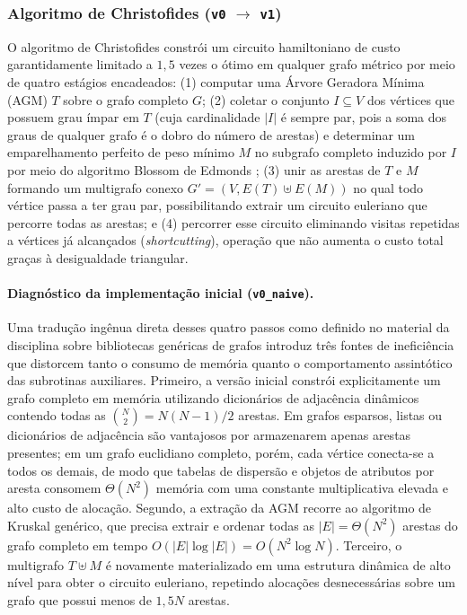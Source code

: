 \subsubsection{Algoritmo de Christofides (\texttt{v0} \texorpdfstring{$\rightarrow$}{->} \texttt{v1})}
\label{sec:christofides}

O algoritmo de Christofides \cite{christofides1976worst} constrói um circuito hamiltoniano de
custo garantidamente limitado a $1{,}5$ vezes o ótimo em qualquer grafo métrico por meio de
quatro estágios encadeados: (1) computar uma Árvore Geradora Mínima (AGM) $T$ sobre o grafo
completo $G$; (2) coletar o conjunto $I \subseteq V$ dos vértices que possuem grau ímpar em
$T$ (cuja cardinalidade $|I|$ é sempre par, pois a soma dos graus de qualquer grafo é o dobro
do número de arestas) e determinar um emparelhamento perfeito de peso mínimo $M$ no subgrafo
completo induzido por $I$ por meio do algoritmo Blossom de Edmonds \cite{edmonds1965paths};
(3) unir as arestas de $T$ e $M$ formando um multigrafo conexo $G' = (V, E(T) \uplus E(M))$ no
qual todo vértice passa a ter grau par, possibilitando extrair um circuito euleriano que
percorre todas as arestas; e (4) percorrer esse circuito eliminando visitas repetidas a
vértices já alcançados (\textit{shortcutting}), operação que não aumenta o custo total graças à
desigualdade triangular.

\paragraph{Diagnóstico da implementação inicial (\texttt{v0\_naive}).}
Uma tradução ingênua direta desses quatro passos como definido no material da disciplina 
sobre bibliotecas genéricas de grafos introduz três
fontes de ineficiência que distorcem tanto o consumo de memória quanto o comportamento
assintótico das subrotinas auxiliares. Primeiro, a versão inicial constrói explicitamente um
grafo completo em memória utilizando dicionários de adjacência dinâmicos contendo todas as
$\binom{N}{2} = N(N-1)/2$ arestas. Em grafos esparsos, listas ou dicionários de adjacência são
vantajosos por armazenarem apenas arestas presentes; em um grafo euclidiano completo, porém,
cada vértice conecta-se a todos os demais, de modo que tabelas de dispersão e objetos de
atributos por aresta consomem $\Theta(N^2)$ memória com uma constante multiplicativa elevada e
alto custo de alocação. Segundo, a extração da AGM recorre ao algoritmo de Kruskal genérico,
que precisa extrair e ordenar todas as $|E| = \Theta(N^2)$ arestas do grafo completo em tempo
$O(|E| \log |E|) = O(N^2 \log N)$. Terceiro, o multigrafo $T \uplus M$ é novamente materializado
em uma estrutura dinâmica de alto nível para obter o circuito euleriano, repetindo alocações
desnecessárias sobre um grafo que possui menos de $1{,}5N$ arestas.

